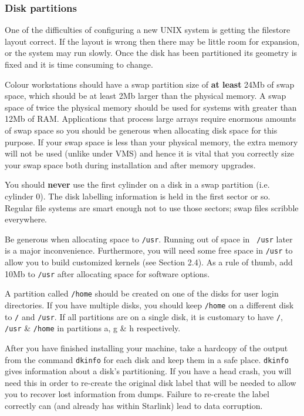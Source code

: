 \subsubsection{Disk partitions}

One of the difficulties of configuring a new UNIX system is getting the
filestore layout correct. If the layout is wrong then there may be little room
for expansion, or the system may run slowly. Once the disk has been partitioned
its geometry is fixed and it is time consuming to change.

Colour workstations should have a swap partition size of {\bf at least} 
24Mb of swap
space, which should be at least 2Mb larger than the physical memory. 
A swap space of twice the physical memory should be used for systems
with greater than 12Mb of RAM. Applications that process large arrays
require enormous amounts of swap space so you should be generous
when allocating disk space for this purpose.
If your
swap space is less than your physical memory, the extra memory will not
be used (unlike under VMS) and hence it is vital that you correctly size
your swap space both during installation and after memory upgrades.

You should {\bf never} use the first cylinder on a disk in a swap partition 
(i.e. cylinder 0). The disk labelling information is held in the first sector
or so. Regular file systems are smart enough not to use those sectors; swap
files scribble everywhere. 

Be generous when allocating space to {\tt /usr}. Running out of space in {\tt
/usr} later is a major inconvenience. Furthermore, you will need some free
space in {\tt /usr} to allow you to build customized kernels (see Section 2.4). As a
rule of thumb, add 10Mb to {\tt /usr} after allocating space for software options. 

A partition called {\tt /home} should be created on one of the disks for user login
directories. If you have multiple disks, you should keep {\tt /home} on a different
disk to {\tt /} and {\tt /usr}. If all partitions are on a single disk, it is customary
to have {\tt /}, {\tt /usr} \& {\tt /home} in partitions a, g \& h  respectively.

After you have finished installing your machine, take a hardcopy of the output
from the command {\tt dkinfo} for each disk and keep them in a safe place.
{\tt dkinfo} gives information about a disk's partitioning. If you have a head crash,
you will need this in order to re-create the original disk label that will
be needed to allow you to recover lost information from dumps. Failure
to re-create the label correctly can (and already has within Starlink) lead
to data corruption. 

